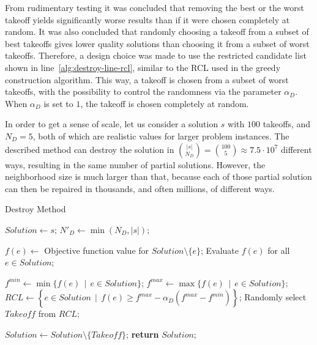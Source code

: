 From rudimentary testing it was concluded that removing the best or the worst takeoff yields significantly worse results than if it were chosen completely at random.
It was also concluded that randomly choosing a takeoff from a subset of best takeoffs gives lower quality solutions than choosing it from a subset of worst takeoffs.
Therefore, a design choice was made to use the restricted candidate list shown in line~\ref{alg:destroy-line-rcl}, similar to the RCL used in the greedy construction algorithm.
This way, a takeoff is chosen from a subset of worst takeoffs, with the possibility to control the randomness via the parameter $\alpha_D$.
When $\alpha_D$ is set to $1$, the takeoff is chosen completely at random.

In order to get a sense of scale, let us consider a solution $s$ with $100$ takeoffs, and $N_D = 5$, both of which are realistic values for larger problem instances.
The described method can destroy the solution in $\binom{\vert s \vert}{N_D} = \binom{100}{5} \approx 7.5 \cdot 10^7$ different ways, resulting in the same number of partial solutions.
However, the neighborhood size is much larger than that, because each of those partial solution can then be repaired in thousands, and often millions, of different ways.

\begin{algorithm}[htbp]
    \caption{Destroy Method}
    \label{alg:destroy}
    
    \newcommand{\Solution}{\mathit{Solution}}
    
    \begin{algorithmic}[1]
            \State $\Solution \gets s$;
            \State $N'_D \gets \min ( N_D, \vert s \vert )$;
            
                \State $f(e) \gets$ Objective function value for $\Solution \setminus \{ e \}$; \label{alg:destroy-line-f-def}
                \State Evaluate $f(e)$ for all $e \in \Solution$;
                
                \State $\mathit{f^{min}} \gets \min \{f(e) \, \mid \, e \in \Solution \}$;
                \State $\mathit{f^{max}} \gets \max \{f(e) \, \mid \, e \in \Solution \}$;
                \State $\mathit{RCL} \gets \left\{e \in \Solution \, \mid \, f(e) \ge f^{max} - \alpha_D \left( f^{max} - f^{min} \right) \right\}$; \label{alg:destroy-line-rcl}
                \State Randomly select $\mathit{Takeoff}$ from $\mathit{RCL}$;
                
                \State $\Solution \gets \Solution \setminus \{ \mathit{Takeoff} \}$;
            \EndFor
            \State \textbf{return} $\Solution$;
        \EndProcedure
    \end{algorithmic}
\end{algorithm}


